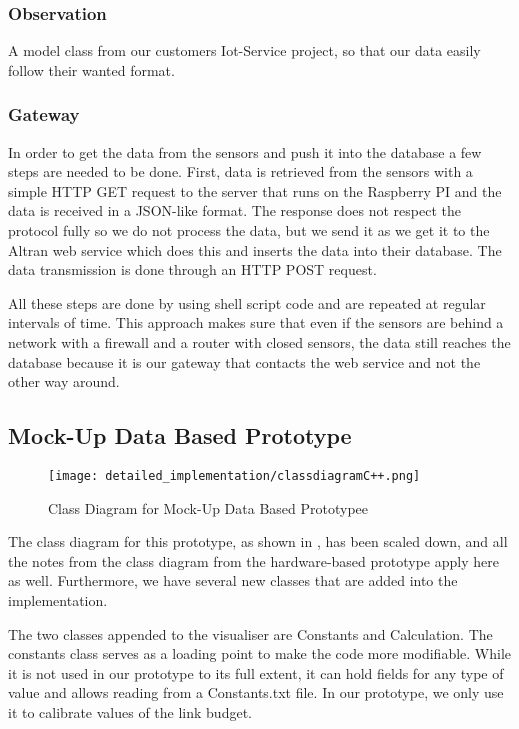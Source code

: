\documentclass[../document]{subfiles}
\begin{document}
\subsubsection{Observation}
A model class from our customers Iot-Service project, so that our data easily follow their wanted format.

\subsubsection{Gateway}
In order to get the data from the sensors and push it into the database a few steps are needed to be done. First, data is retrieved from the sensors with a simple HTTP GET request to the server that runs on the Raspberry PI and the data is received in a JSON-like format. The response does not respect the protocol fully so we do not process the data, but we send it as we get it to the Altran web service which does this and inserts the data into their database. The data transmission is done through an HTTP POST request. 

All these steps are done by using shell script code and are repeated at regular intervals of time.
This approach makes sure that even if the sensors are behind a network with a firewall and a router with closed sensors, the data still reaches the database because it is our gateway that contacts the web service and not the other way around.

\subsection{Mock-Up Data Based Prototype}

\begin{figure}[H]
\centering
\texttt{[image: detailed\_implementation/classdiagramC++.png]}
\caption{Class Diagram for Mock-Up Data Based Prototypee}
\label{fig:ClassDiagramC++}
\end{figure}

The class diagram for this prototype, as shown in , has been scaled down, and all the notes from the class diagram from the hardware-based prototype apply here as well. Furthermore, we have several new classes that are added into the implementation.

The two classes appended to the visualiser are Constants and Calculation. The constants class serves as a loading point to make the code more modifiable. While it is not used in our prototype to its full extent, it can hold fields for any type of value and allows reading from a Constants.txt file. In our prototype, we only use it to calibrate values of the link budget. 
\end{document}
